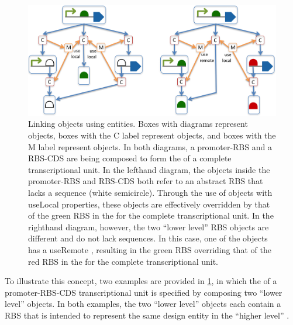\begin{figure}[ht]
\begin{center}
\includegraphics[scale=1]{images/MapsTo_Diagram3}
\caption{Linking  objects using  entities. Boxes with diagrams represent  objects, boxes with the C label represent  objects, and boxes with the M label represent  objects. In both diagrams, a promoter-RBS  and a RBS-CDS  are being composed to form the  of a complete transcriptional unit. In the lefthand diagram, the  objects inside the promoter-RBS  and RBS-CDS  both refer to an abstract RBS   that lacks a sequence (white semicircle). Through the use of  objects with useLocal  properties, these  objects are effectively overridden by that of the green RBS in the  for the complete transcriptional unit. In the righthand diagram, however, the two ``lower level'' RBS  objects are different and do not lack sequences. In this case, one of the  objects has a useRemote , resulting in the green RBS  overriding that of the red RBS in the  for the complete transcriptional unit.}
\label{image:maps_to_diagram2}
\end{center}
\end{figure}

To illustrate this concept, two examples are provided in \ref{image:maps_to_diagram2}, in which the  of a promoter-RBS-CDS transcriptional unit is specified by composing two ``lower level''  objects.
In both examples, the two ``lower level''  objects each contain a RBS  that is intended to represent the same design entity in the ``higher level'' .

